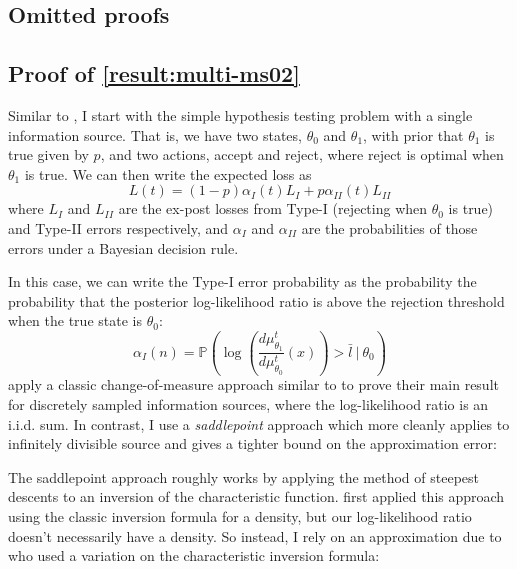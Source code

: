 \documentclass{fancyArticle}
\renewcommand{\|}{\,|\,}                    %
\providecommand{\;}{\,;}                    %
\begin{document}
\begin{appendix}

  \pagebreak
  \section{Omitted proofs}
  \label{sec:proofs}


  \subsection{Proof of \autoref{result:multi-ms02}}
  \label{sec:proof-multi-ms02}

  Similar to \cite{Moscarini2002}, I start with the simple hypothesis testing problem with a single information source.
  That is, we have two states, $\theta_0$ and $\theta_1$, with prior that $\theta_1$ is true given by $p$, and two actions, accept and reject, where reject is optimal when $\theta_1$ is true.
  We can then write the expected loss as
  \begin{equation*}
    L(t) = (1-p)\alpha_I(t)L_I + p\alpha_{II}(t)L_{II}
  \end{equation*}
  where $L_I$ and $L_{II}$ are the ex-post losses from Type-I (rejecting when $\theta_0$ is true) and Type-II errors respectively, and $\alpha_I$ and $\alpha_{II}$ are the probabilities of those errors under a Bayesian decision rule.

  In this case, we can write the Type-I error probability as the probability the probability that the posterior log-likelihood ratio is above the rejection threshold when the true state is $\theta_0$:
  \begin{equation*}
    \alpha_{I}(n) = \mathbb{P}\left(
      \log \left( \frac{d\mu_{\theta_1}^t}{d\mu_{\theta_0}^t}(x) \right)
      > \bar{l} \ \bigg|\ \theta_0\right)
  \end{equation*}
  \cite{Moscarini2002} apply a classic change-of-measure approach similar to \cite{Cramer1938} to prove their main result for discretely sampled information sources, where the log-likelihood ratio is an i.i.d. sum.
  In contrast, I use a \textit{saddlepoint} approach which more cleanly applies to infinitely divisible source and gives a tighter bound on the approximation error:

  The saddlepoint approach roughly works by applying the method of steepest descents \citep[see Ch. 17][]{Jeffreys1956} to an inversion of the characteristic function.
  \cite{Daniels1954} first applied this approach using the classic inversion formula for a density, but our log-likelihood ratio doesn't necessarily have a density.
  So instead, I rely on an approximation due to \cite{Lugannani1980} who used a variation on the \cite{Gil-Pelaez1951} characteristic inversion formula:


\end{appendix}
\end{document}
